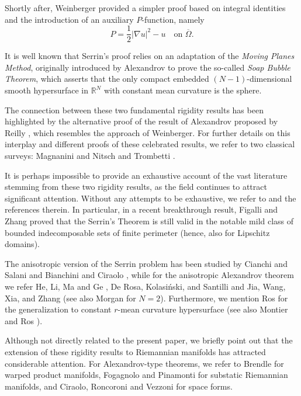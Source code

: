\documentclass[10pt,a4paper, reqno]{amsart}
\numberwithin{equation}{section}
\begin{document}
Shortly after, Weinberger \cite{w} provided a simpler proof based on integral identities and the introduction of an auxiliary $P$-function, namely
\begin{equation}\label{intro eq P}
        P = \frac{1}{2} |\nabla u|^2 - u \quad\text{on }\overline{\Omega}.
\end{equation}

It is well known that Serrin's proof relies on an adaptation of the \textit{Moving Planes Method}, originally introduced by Alexandrov \cite{a58,a62} to prove the so-called {\it Soap Bubble Theorem}, which asserts that the only compact embedded $(N-1)$-dimensional smooth hypersurface in $\mathbb{R}^N$ with constant mean curvature is the sphere.

The connection between these two fundamental rigidity results has been highlighted by the alternative proof of the result of Alexandrov proposed by Reilly \cite{re77,re82}, which resembles the approach of Weinberger. For further details on this interplay and different proofs of these celebrated results, we refer to two classical surveys: Magnanini \cite{ma2017} and Nitsch and Trombetti \cite{nt}.

It is perhaps impossible to provide an exhaustive account of the vast literature stemming from these two rigidity results, as the field continues to attract significant attention. 
Without any attempts to be exhaustive, we refer to \cite{agbomaz2025, bc, bnst, bh, cgs, cs, dep23, fj, fk, fv, f, fgk, gnn, hp, p,ro} and the references therein. In particular, in a recent breakthrough result,  Figalli and Zhang \cite{fz2025} proved that the Serrin’s Theorem is still valid in the notable mild class of bounded indecomposable sets of finite perimeter (hence, also for Lipschitz domains).

The anisotropic version of the Serrin problem has been studied by Cianchi and Salani \cite{cs} and Bianchini and Ciraolo \cite{bc}, while for the anisotropic Alexandrov theorem we refer He, Li, Ma and Ge \cite{hlmg2009}, De Rosa, Kolasi\'nski, and Santilli \cite{dks2020} and Jia, Wang, Xia, and Zhang \cite{jwxz2023} (see also Morgan \cite{m2005} for $N=2$). 
Furthermore, we mention Ros \cite{ro} for the generalization to constant $r$-mean curvature hypersurface (see also Montier and Ros \cite{mr1991}). 

Although not directly related to the present paper, we briefly point out that the extension of these rigidity results to Riemannian manifolds has attracted considerable attention. For Alexandrov-type theorems, we refer to Brendle \cite{b2013} for warped product manifolds, Fogagnolo and Pinamonti \cite{fp2022} for substatic Riemannian manifolds, and Ciraolo, Roncoroni and Vezzoni \cite{crv2021} for space forms. 
\end{document}

